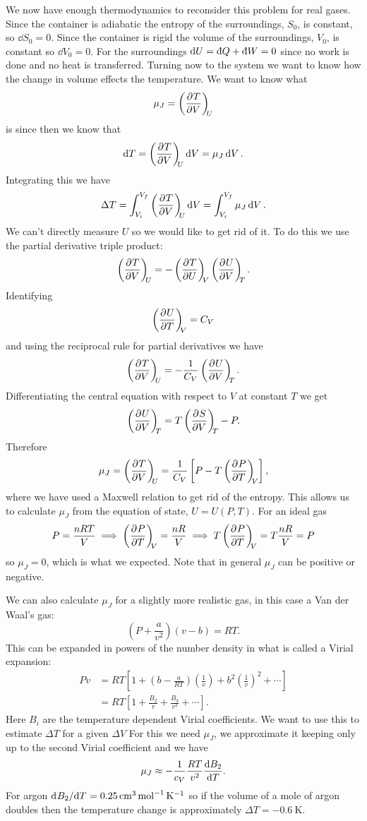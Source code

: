     We now have enough thermodynamics to reconsider this problem for real gases.
    Since the container is adiabatic the entropy of the surroundings, \(S_0\), is constant, so \(\dd{S_0} = 0\).
    Since the container is rigid the volume of the surroundings, \(V_0\), is constant so \(\dd{V_0} = 0\).
    For the surroundings \(\dd{U} = \ddbar{Q} + \ddbar{W} = 0\) since no work is done and no heat is transferred.
    Turning now to the system we want to know how the change in volume effects the temperature.
    We want to know what
    \[\mu_J = \left(\pdv[]{T}{V}\right)_{\!\!{U}}\]
    is since then we know that
    \[\dd{T} = \left(\pdv[]{T}{V}\right)_{\!\!{U}}\dd{V} = \mu_J\dd{V}.\]
    Integrating this we have
    \[\Delta T = \int_{V_i}^{V_f}\left(\pdv[]{T}{V}\right)_{\!\!{U}}\dd{V} = \int_{V_i}^{V_f}\mu_J\dd{V}.\]
    We can't directly measure \(U\) so we would like to get rid of it.
    To do this we use the partial derivative triple product:
    \[\left(\pdv[]{T}{V}\right)_{\!\!{U}} = -\left(\pdv[]{T}{U}\right)_{\!\!{V}}\left(\pdv[]{U}{V}\right)_{\!\!{T}}.\]
    Identifying
    \[\left(\pdv[]{U}{T}\right)_{\!\!{V}} = C_V\]
    and using the reciprocal rule for partial derivatives we have
    \[\left(\pdv[]{T}{V}\right)_{\!\!{U}} = -\frac{1}{C_V}\left(\pdv[]{U}{V}\right)_{\!\!{T}}.\]
    Differentiating the central equation with respect to \(V\) at constant \(T\) we get
    \[\left(\pdv[]{U}{V}\right)_{\!\!{T}} = T\left(\pdv[]{S}{V}\right)_{\!\!{T}} - P.\]
    Therefore
    \[\mu_J = \left(\pdv[]{T}{V}\right)_{\!\!{U}} = \frac{1}{C_V}\left[P - T\left(\pdv[]{P}{T}\right)_{\!\!{V}}\right],\]
    where we have used a Maxwell relation to get rid of the entropy.
    This allows us to calculate \(\mu_J\) from the equation of state, \(U = U(P, T)\).
    For an ideal gas
    \[P = \frac{nRT}{V} \implies \left(\pdv[]{P}{T}\right)_{\!\!{V}} = \frac{nR}{V} \implies T\left(\pdv[]{P}{T}\right)_{\!\!{V}} = T\frac{nR}{V} = P\]
    so \(\mu_J = 0\), which is what we expected.
    Note that in general \(\mu_J\) can be positive or negative.
    
    We can also calculate \(\mu_J\) for a slightly more realistic gas, in this case a Van der Waal's gas:
    \[\left(P + \frac{a}{v^2}\right)(v - b) = RT.\]
    This can be expanded in powers of the number density in what is called a Virial expansion:
    \begin{align*}
        Pv &= RT\left[1 + \left(b - \frac{a}{RT}\right)\left(\frac{1}{v}\right) + b^2\left(\frac{1}{v}\right)^2 + \dotsb\right]\\
        &= RT\left[1 + \frac{B_2}{v} + \frac{B_3}{v^2} + \dotsb\right].
    \end{align*}
    Here \(B_i\) are the temperature dependent Virial coefficients.
    We want to use this to estimate \(\Delta T\) for a given \(\Delta V\)
    For this we need \(\mu_J\), we approximate it keeping only up to the second Virial coefficient and we have
    \[\mu_J \approx -\frac{1}{c_V}\frac{RT}{v^2}\dv{B_2}{T}.\]
    For argon \(\mathrm{d}^{}{B_2}/\mathrm{d}{T}^{} = \SI{0.25}{\centi\metre^3.\mole^{-1}.\kelvin^{-1}}\) so if the volume of a mole of argon doubles then the temperature change is approximately \(\Delta T = \SI{-0.6}{\kelvin}\).
    
